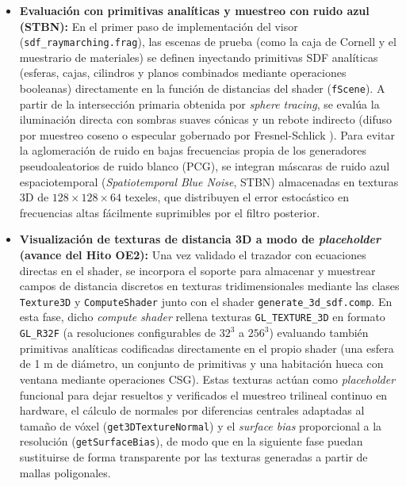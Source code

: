 \begin{itemize}
  \item \textbf{Evaluación con primitivas analíticas y muestreo con ruido azul (STBN):} En el primer paso de implementación del visor (\texttt{sdf\_raymarching.\allowbreak frag}), las escenas de prueba (como la caja de Cornell y el muestrario de materiales) se definen inyectando primitivas SDF analíticas (esferas, cajas, cilindros y planos combinados mediante operaciones booleanas) directamente en la función de distancias del shader (\texttt{fScene}). A partir de la intersección primaria obtenida por \textit{sphere tracing}, se evalúa la iluminación directa con sombras suaves cónicas y un rebote indirecto (difuso por muestreo coseno o especular gobernado por Fresnel-Schlick \cite{karis2013}). Para evitar la aglomeración de ruido en bajas frecuencias propia de los generadores pseudoaleatorios de ruido blanco (PCG), se integran máscaras de ruido azul espaciotemporal (\textit{Spatiotemporal Blue Noise}, STBN) \cite{wolfe2022egsr, wolfe2022nv} almacenadas en texturas 3D de $128 \times 128 \times 64$ texeles, que distribuyen el error estocástico en frecuencias altas fácilmente suprimibles por el filtro posterior.
  \item \textbf{Visualización de texturas de distancia 3D a modo de \textit{placeholder} (avance del Hito OE2):} Una vez validado el trazador con ecuaciones directas en el shader, se incorpora el soporte para almacenar y muestrear campos de distancia discretos en texturas tridimensionales mediante las clases \texttt{Texture3D} y \texttt{ComputeShader} junto con el shader \texttt{generate\_3d\_sdf.\allowbreak comp}. En esta fase, dicho \textit{compute shader} rellena texturas \texttt{GL\_TEXTURE\_3D} en formato \texttt{GL\_R32F} (a resoluciones configurables de $32^3$ a $256^3$) evaluando también primitivas analíticas codificadas directamente en el propio shader (una esfera de 1 m de diámetro, un conjunto de primitivas y una habitación hueca con ventana mediante operaciones CSG). Estas texturas actúan como \textit{placeholder} funcional para dejar resueltos y verificados el muestreo trilineal continuo en hardware, el cálculo de normales por diferencias centrales adaptadas al tamaño de vóxel (\texttt{get3DTextureNormal}) y el \textit{surface bias} proporcional a la resolución (\texttt{getSurfaceBias}), de modo que en la siguiente fase puedan sustituirse de forma transparente por las texturas generadas a partir de mallas poligonales.

\end{itemize}
